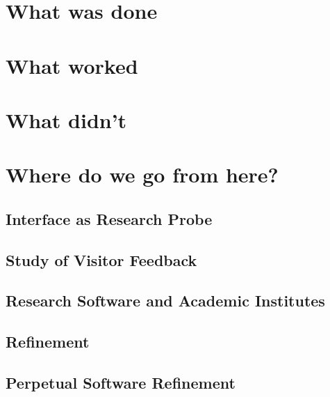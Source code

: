 \section{What was done}\label{what-was-done}

\section{What worked}\label{what-worked}

\section{What didn't}\label{what-didnt}

\section{Where do we go from here?}\label{where-do-we-go-from-here}
\subsection{Interface as Research Probe}
\subsection{Study of Visitor Feedback}
\subsection{Research Software and Academic Institutes}
\subsection{Refinement}
\subsection{Perpetual Software Refinement}
